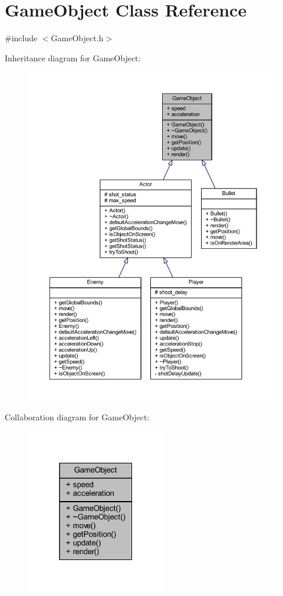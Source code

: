 \hypertarget{class_game_object}{}\section{Game\+Object Class Reference}
\label{class_game_object}


{\ttfamily \#include $<$Game\+Object.\+h$>$}



Inheritance diagram for Game\+Object\+:\nopagebreak
\begin{figure}[H]
\begin{center}
\leavevmode
\includegraphics[width=350pt]{class_game_object__inherit__graph}
\end{center}
\end{figure}


Collaboration diagram for Game\+Object\+:\nopagebreak
\begin{figure}[H]
\begin{center}
\leavevmode
\includegraphics[width=172pt]{class_game_object__coll__graph}
\end{center}
\end{figure}
